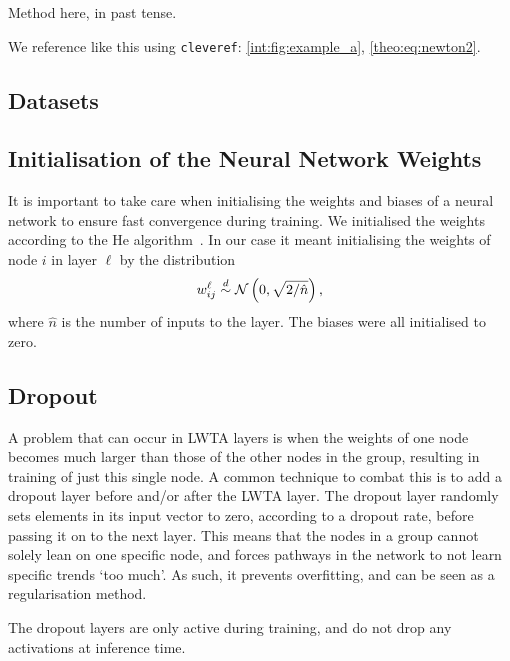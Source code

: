 Method here, in past tense.

We reference like this using \verb|cleveref|: \cref{int:fig:example_a}, \cref{theo:eq:newton2}.

\subsection{Datasets}


\subsection{Initialisation of the Neural Network Weights}
    It is important to take care when initialising the weights and biases of a neural network to ensure fast convergence during training. We initialised the weights according to the He algorithm~\citep{He}. In our case it meant initialising the weights of node $i$ in layer $\ell$ by the distribution
    \begin{align}
        w^\ell_{ij} \overset{d}{\sim} \operatorname{\mathcal{N}}\left(0,\sqrt{2/\hat{n}}\right),
    \end{align}
    where $\hat{n}$ is the number of inputs to the layer. The biases were all initialised to zero.


\subsection{Dropout}
    A problem that can occur in LWTA layers is when the weights of one node becomes much larger than those of the other nodes in the group, resulting in training of just this single node. A common technique to combat this is to add a dropout layer before and/or after the LWTA layer. The dropout layer randomly sets elements in its input vector to zero, according to a dropout rate, before passing it on to the next layer. This means that the nodes in a group cannot solely lean on one specific node, and forces pathways in the network to not learn specific trends `too much'. As such, it prevents overfitting, and can be seen as a regularisation method.

    The dropout layers are only active during training, and do not drop any activations at inference time.


